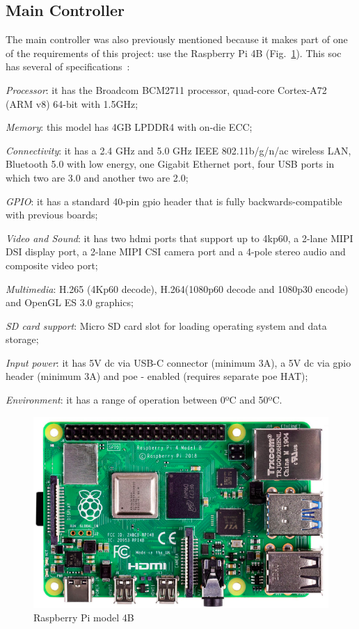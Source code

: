 \subsection{Main Controller}
\label{sec:main-contr}

The main controller was also previously mentioned because it makes part of one of the requirements of this project: use the Raspberry Pi 4B (Fig.~\ref{fig:raspberri}).
This \gls{soc} has several of specifications~\cite{rasp-specs}:
%
\begin{item-c}
\item \emph{Processor}: it has the Broadcom BCM2711 processor, quad-core Cortex-A72 (ARM v8) 64-bit with 1.5GHz;
%
\item \emph{Memory}: this model has 4GB LPDDR4 with on-die ECC;
%
\item \emph{Connectivity}: it has a 2.4 GHz and 5.0 GHz IEEE 802.11b/g/n/ac wireless LAN, Bluetooth 5.0 with low energy, one Gigabit Ethernet port, four USB ports in which two are 3.0 and another two are 2.0;
%
\item \emph{GPIO}: it has a standard 40-pin \gls{gpio} header that is fully backwards-compatible with previous boards;
%
\item \emph{Video and Sound}: it has two \gls{hdmi} ports that support up to 4kp60, a 2-lane MIPI DSI display port, a 2-lane MIPI CSI camera port and a 4-pole stereo audio and composite video port;
%
\item \emph{Multimedia}: H.265 (4Kp60 decode), H.264(1080p60 decode and 1080p30 encode) and OpenGL ES 3.0 graphics;
%
\item \emph{SD card support}: Micro SD card slot for loading operating system and data storage;
%
\item \emph{Input power}: it has 5V \gls{dc} via USB-C connector (minimum 3A), a 5V \gls{dc} via \gls{gpio} header (minimum 3A) and \gls{poe} - enabled (requires separate \gls{poe} HAT);
%
\item \emph{Environment}: it has a range of operation between 0ºC and 50ºC.
\end{item-c}
%
\begin{figure}[htb!]
\centering
    \includegraphics[width=0.6\columnwidth]{./img/raspberry.png}
  \caption{Raspberry Pi model 4B}%
\label{fig:raspberri}
\end{figure}

